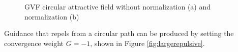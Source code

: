 \documentclass[numbered,pdftex]{ohio-etd}
\begin{document}
\begin{figure}[H]
	\begin{subfigmatrix}{2}%
		\centering	
		\hspace*{0mm}
	\end{subfigmatrix}
	\caption{GVF circular attractive field without normalization (a) and normalization (b)}
	\label{fig:gvfCircAttractive}
\end{figure}


\noindent

Guidance that repels from a circular path can be produced by setting the convergence weight $G=-1$, shown in Figure \ref{fig:largerepulsive}. 
\end{document}
